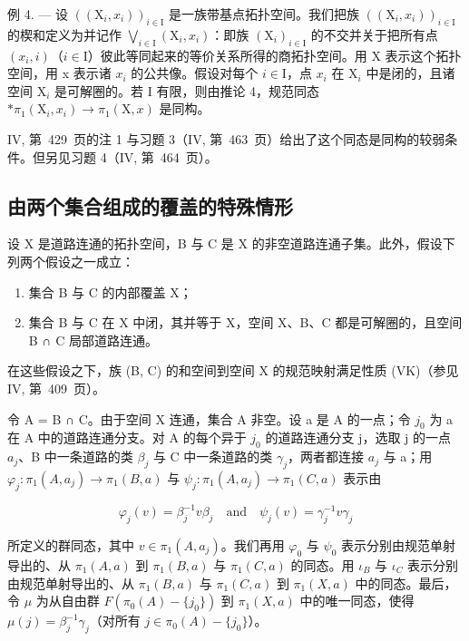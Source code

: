 例 4. — 设 \(((\mathrm{X}_{i}, x_{i}))_{i \in \mathrm{I}}\) 是一族带基点拓扑空间。我们把族 \(((\mathrm{X}_{i}, x_{i}))_{i \in \mathrm{I}}\) 的楔和定义为并记作 \(\bigvee_{i \in \mathrm{I}} (\mathrm{X}_{i}, x_{i})\)：即族 \((\mathrm{X}_{i})_{i \in \mathrm{I}}\) 的不交并关于把所有点 \((x_{i}, i)\)（\(i \in \mathrm{I}\)）彼此等同起来的等价关系所得的商拓扑空间。用 X 表示这个拓扑空间，用 x 表示诸 \(x_{i}\) 的公共像。假设对每个 \(i \in \mathrm{I}\)，点 \(x_{i}\) 在 \(\mathrm{X}_{i}\) 中是闭的，且诸空间 \(\mathrm{X}_{i}\) 是可解圈的。若 I 有限，则由推论 4，规范同态 \(* \pi_{1}(\mathrm{X}_{i}, x_{i}) \to \pi_{1}(\mathrm{X}, x)\) 是同构。

IV, 第~429~页的注 1 与习题 3（IV, 第~463~页）给出了这个同态是同构的较弱条件。但另见习题 4（IV, 第~464~页）。

\subsection{由两个集合组成的覆盖的特殊情形}

设 X 是道路连通的拓扑空间，B 与 C 是 X 的非空道路连通子集。此外，假设下列两个假设之一成立：

\begin{enumerate}
\def\labelenumi{(\roman{enumi})}
\item
  集合 B 与 C 的内部覆盖 X；
\item
  集合 B 与 C 在 X 中闭，其并等于 X，空间 X、B、C 都是可解圈的，且空间 B ∩ C 局部道路连通。
\end{enumerate}

在这些假设之下，族 (B, C) 的和空间到空间 X 的规范映射满足性质 (VK)（参见 IV, 第~409~页）。

令 A = B ∩ C。由于空间 X 连通，集合 A 非空。设 a 是 A 的一点；令 \(j_{0}\) 为 a 在 A 中的道路连通分支。对 A 的每个异于 \(j_{0}\) 的道路连通分支 j，选取 j 的一点 \(a_{j}\)、B 中一条道路的类 \(\beta_{j}\) 与 C 中一条道路的类 \(\gamma_{j}\)，两者都连接 \(a_{j}\) 与 a；用 \(\varphi_{j}\colon\pi_{1}(A,a_{j})\to\pi_{1}(B,a)\) 与 \(\psi_{j}\colon\pi_{1}(A,a_{j})\to\pi_{1}(C,a)\) 表示由

\[
\varphi_ {j} (v) = \beta_ {j} ^ {- 1} v \beta_ {j} \quad \text {and} \quad \psi_ {j} (v) = \gamma_ {j} ^ {- 1} v \gamma_ {j}
\]

所定义的群同态，其中 \(v \in \pi_1(A, a_j)\)。我们再用 \(\varphi_0\) 与 \(\psi_0\) 表示分别由规范单射导出的、从 \(\pi_1(A, a)\) 到 \(\pi_1(B, a)\) 与 \(\pi_1(C, a)\) 的同态。用 \(\iota_B\) 与 \(\iota_C\) 表示分别由规范单射导出的、从 \(\pi_1(B, a)\) 与 \(\pi_1(C, a)\) 到 \(\pi_1(X, a)\) 中的同态。最后，令 \(\mu\) 为从自由群 \(F(\pi_0(A) - \{j_0\})\) 到 \(\pi_1(X, a)\) 中的唯一同态，使得 \(\mu(j) = \beta_j^{-1}\gamma_j\)（对所有 \(j \in \pi_0(A) - \{j_0\}\)）。

